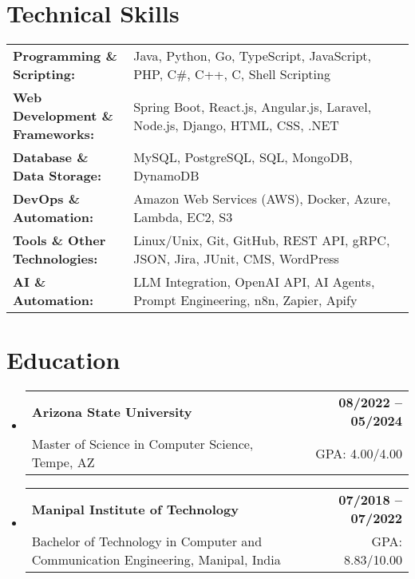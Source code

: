 \documentclass[letterpaper,11pt]{article}
\makeatletter
\newcommand{\educationSubheading}[4]{
  \vspace{-2pt}\item
    \begin{tabular*}{1.0\textwidth}[t]{l@{\extracolsep{\fill}}r}
      \textbf{\small #1} & \textbf{\small #2} \\
      {\small#3} & {\small #4} \\
    \end{tabular*}\vspace{-7pt}
}
\newcommand{\resumeSubHeadingListStart}{\begin{itemize}[leftmargin=0pt, label={}]}
\newcommand{\resumeSubHeadingListEnd}{\end{itemize}}
\makeatother
\begin{document}
\section{Technical Skills}
        \vspace{-14pt}
        \begin{table}[h]
            \footnotesize
            \begin{tabular}{p{0.3\linewidth} p{0.7\linewidth}}
                \textbf{Programming \& Scripting:} & Java, Python, Go, TypeScript, JavaScript, PHP, C\#, C++, C, Shell Scripting \\
                \textbf{Web Development \& Frameworks:} & Spring Boot, React.js, Angular.js, Laravel, Node.js, Django, HTML, CSS, .NET \\
                \textbf{Database \& Data Storage:} & MySQL, PostgreSQL, SQL, MongoDB, DynamoDB \\
                \textbf{DevOps \& Automation:} & Amazon Web Services (AWS), Docker, Azure, Lambda, EC2, S3 \\
                \textbf{Tools \& Other Technologies:} & Linux/Unix, Git, GitHub, REST API, gRPC, JSON, Jira, JUnit, CMS, WordPress \\
                \textbf{AI \& Automation:} & LLM Integration, OpenAI API, AI Agents, Prompt Engineering, n8n, Zapier, Apify \\
            \end{tabular}
        \end{table}

 \vspace{-15pt}

\section{Education}
  \resumeSubHeadingListStart
    \educationSubheading
      {Arizona State University}{08/2022 -- 05/2024}
      {Master of Science in Computer Science, Tempe, AZ}{GPA: 4.00/4.00}

    \educationSubheading
      {Manipal Institute of Technology}{07/2018 -- 07/2022}
      {Bachelor of Technology in Computer and Communication Engineering, Manipal, India}{GPA: 8.83/10.00}
  \resumeSubHeadingListEnd
\end{document}
